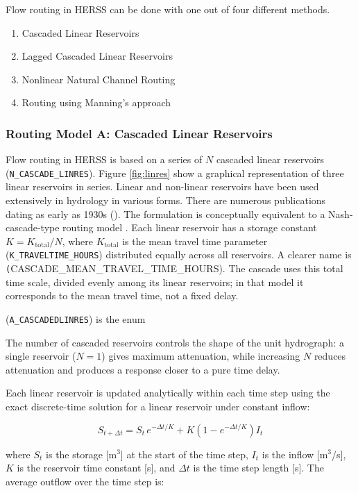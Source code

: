 \documentclass[a4paper, 12pt]{report}
\begin{document}
	Flow routing in HERSS can be done with one out of four different methods. 

	\begin{enumerate}[label=\Alph*.]
		\item Cascaded Linear Reservoirs 
		\item Lagged Cascaded Linear Reservoirs
		\item Nonlinear Natural Channel Routing 
		\item Routing using Manning's approach
	\end{enumerate}


	\subsubsection{Routing Model A: Cascaded Linear Reservoirs}
	Flow routing in HERSS is based on a series of $N$ cascaded linear reservoirs
	(\texttt{N\_CASCADE\_LINRES}). Figure \ref{fig:linres} show a graphical representation of 
	three linear reservoirs in series. Linear and non-linear reservoirs have been used extensively
	in hydrology in various forms. There are numerous publications dating as early as 1930s (\cite{Zoch1934, maccarthy1938, Nash1957, Dooge1959, chow88, maidment1993, MATEO2015}). The formulation is conceptually equivalent to a Nash-cascade-type routing model \cite{Nash1957}. 
	Each linear reservoir has a storage constant
	$K = K_\mathrm{total} / N$, where $K_\mathrm{total}$ is the mean travel time parameter
	(\texttt{K\_TRAVELTIME\_HOURS}) distributed equally across all reservoirs.
	A clearer name is \texttt(CASCADE\_MEAN\_TRAVEL\_TIME\_HOURS). The cascade uses this total time scale, divided evenly among its linear reservoirs; in that model it corresponds to the mean travel time, 	not a fixed delay. 
	
	(\texttt{A\_CASCADEDLINRES}) is the enum 
	
	The number of
	cascaded reservoirs controls the shape of the unit hydrograph: a single reservoir ($N = 1$)
	gives maximum attenuation, while increasing $N$ reduces attenuation and produces a response
	closer to a pure time delay.

	Each linear reservoir is updated analytically within each time step using the exact
	discrete-time solution for a linear reservoir under constant inflow:

	\[
	S_{t+\Delta t} = S_t \, e^{-\Delta t / K} + K \left(1 - e^{-\Delta t / K}\right) I_t
	\]

	where $S_t$ is the storage [m$^3$] at the start of the time step, $I_t$ is the inflow
	[m$^3$/s], $K$ is the reservoir time constant [s], and $\Delta t$ is the time step length
	[s]. The average outflow over the time step is:
\end{document}
